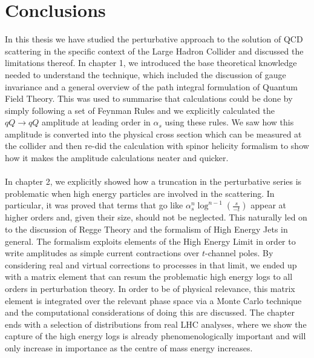 \chapter{Conclusions}

In this thesis we have studied the perturbative approach to the solution of QCD scattering in the specific context of the Large Hadron Collider and discussed the limitations thereof. In chapter 1, we introduced the base theoretical knowledge needed to understand the technique, which included the discussion of gauge invariance and a general overview of the path integral formulation of Quantum Field Theory. This was used to summarise that calculations could be done by simply following a set of Feynman Rules and we explicitly calculated the $qQ \to qQ$ amplitude at leading order in $\alpha_s$ using these rules. We saw how this amplitude is converted into the physical cross section which can be measured at the collider and then re-did the calculation with spinor helicity formalism to show how it makes the amplitude calculations neater and quicker. \\
\\
In chapter 2, we explicitly showed how a truncation in the perturbative series is problematic when high energy particles are involved in the scattering. In particular, it was proved that terms that go like $\alpha_s^{n} \log^{n-1}\left(\frac{s}{-t} \right)$ appear at higher orders and, given their size, should not be neglected. This naturally led on to the discussion of Regge Theory and the formalism of High Energy Jets in general. The formalism exploits elements of the High Energy Limit in order to write amplitudes as simple current contractions over $t$-channel poles. By considering real and virtual corrections to processes in that limit, we ended up with a matrix element that can resum the problematic high energy logs to all orders in perturbation theory. In order to be of physical relevance, this matrix element is integrated over the relevant phase space via a Monte Carlo technique and the computational considerations of doing this are discussed. The chapter ends with a selection of distributions from real LHC analyses, where we show the capture of the high energy logs is already phenomenologically important and will only increase in importance as the centre of mass energy increases. \\
\\
